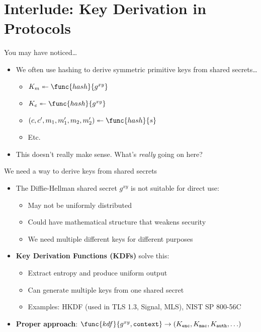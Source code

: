 \ifdefined\PRESENTATION\else\PassOptionsToClass{handout}{beamer}\fi\documentclass[aspectratio=169, lualatex]{beamer}
\begin{document}
\section{Interlude: Key Derivation in Protocols}

\begin{frame}{You may have noticed\ldots}
	\begin{itemize}
		\item We often use hashing to derive symmetric primitive keys from shared secrets\ldots
		      \begin{itemize}
			      \item $K_m \twoheadleftarrow \func{hash}{g^{xy}}$
			      \item $K_e \twoheadleftarrow \func{hash}{g^{xy}}$
			      \item $(c, c', m_{1}, m_{1}', m_{2}, m_{2}')  \twoheadleftarrow \func{hash}{s}$
			      \item Etc.
		      \end{itemize}
		\item This doesn't really make sense. What's \textit{really} going on here?
	\end{itemize}
\end{frame}

\begin{frame}{We need a way to derive keys from shared secrets}
	\begin{itemize}
		\item The Diffie-Hellman shared secret $g^{xy}$ is not suitable for direct use:
		      \begin{itemize}
			      \item May not be uniformly distributed
			      \item Could have mathematical structure that weakens security
			      \item We need multiple different keys for different purposes
		      \end{itemize}
		\item \textbf{Key Derivation Functions (KDFs)} solve this:
		      \begin{itemize}
			      \item Extract entropy and produce uniform output
			      \item Can generate multiple keys from one shared secret
			      \item Examples: HKDF (used in TLS 1.3, Signal, MLS), NIST SP 800-56C
		      \end{itemize}
		\item \textbf{Proper approach}: $\func{kdf}{g^{xy}, \texttt{context}} \rightarrow (K_{\texttt{enc}}, K_{\texttt{mac}}, K_{\texttt{auth}}, \ldots)$
	\end{itemize}
\end{frame}
\end{document}
